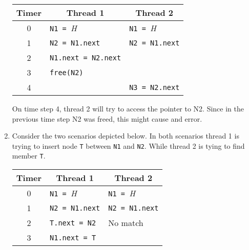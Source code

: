 \documentclass[12pt]{article}
\begin{document}
\begin{enumerate}[label=\alph*.]
    \begin{center}
        \begin{tabular}{| c | l | l |}
            \hline
            \multicolumn{1}{|c|}{Timer} & \multicolumn{1}{|c|}{Thread 1} & \multicolumn{1}{|c|}{Thread 2}\\ \hline
            0     & \texttt{N1 = }\emph{H}      & \texttt{N1 = }\emph{H} \\ \hline
            1     & \texttt{N2 = N1.next}       & \texttt{N2 = N1.next} \\ \hline
            2     & \texttt{N1.next = N2.next}  & \texttt{} \\ \hline
            3     & \texttt{free(N2)}           &  \\ \hline
            4     &                             & \texttt{N3 = N2.next} \\
            \hline
        \end{tabular}
    \end{center}
    
    On time step 4, thread 2 will try to access the pointer to N2. Since in the previous time step N2 was freed, this might cause and error.
    
    \item \addtocounter{enumi}{1} Consider the two scenarios depicted below. In both scenarios thread 1 is trying to insert node \texttt{T} between \texttt{N1} and \texttt{N2}. While thread 2 is tying to find member \texttt{T}.
    
    \begin{center}
        \begin{tabular}{| c | l | l |}
            \hline
            \multicolumn{1}{|c|}{Timer} & \multicolumn{1}{|c|}{Thread 1} & \multicolumn{1}{|c|}{Thread 2}\\ \hline
            0     & \texttt{N1 = }\emph{H}      & \texttt{N1 = }\emph{H} \\ \hline
            1     & \texttt{N2 = N1.next}       & \texttt{N2 = N1.next} \\ \hline
            2     & \texttt{T.next = N2}        & No match\\ \hline
            3     & \texttt{N1.next = T}        & \\
            \hline
        \end{tabular}
    \end{center}
    

\end{enumerate}
\end{document}
